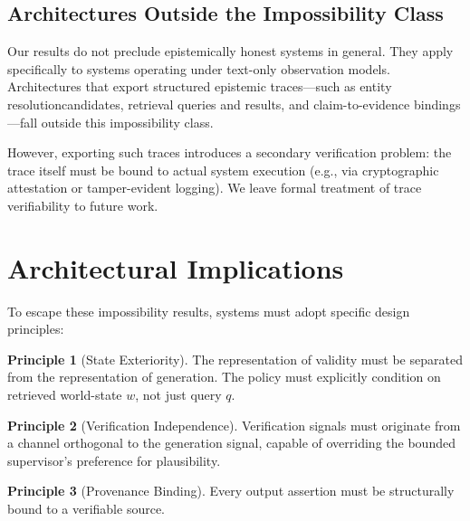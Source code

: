 \documentclass[11pt]{article}
\theoremstyle{definition}
\newtheorem{axiom}{Principle}[section]
\theoremstyle{plain}
\theoremstyle{remark}
\begin{document}
\subsection{Architectures Outside the Impossibility Class}

Our results do not preclude epistemically honest systems in general. They apply specifically to systems operating under text-only observation models. Architectures that export structured epistemic traces—such as entity resolutioncandidates, retrieval queries and results, and claim-to-evidence bindings—fall
outside this impossibility class.

However, exporting such traces introduces a secondary verification problem: the trace itself must be bound to actual system execution (e.g., via cryptographic attestation or tamper-evident logging). We leave formal treatment of trace verifiability to future work.


\section{Architectural Implications}

To escape these impossibility results, systems must adopt specific design principles:

\begin{axiom}[State Exteriority]
The representation of validity must be separated from the representation of generation. The policy must explicitly condition on retrieved world-state $w$, not just query $q$.
\end{axiom}

\begin{axiom}[Verification Independence]
Verification signals must originate from a channel orthogonal to the generation signal, capable of overriding the bounded supervisor's preference for plausibility.
\end{axiom}

\begin{axiom}[Provenance Binding]
Every output assertion must be structurally bound to a verifiable source.
\end{axiom}
\end{document}
